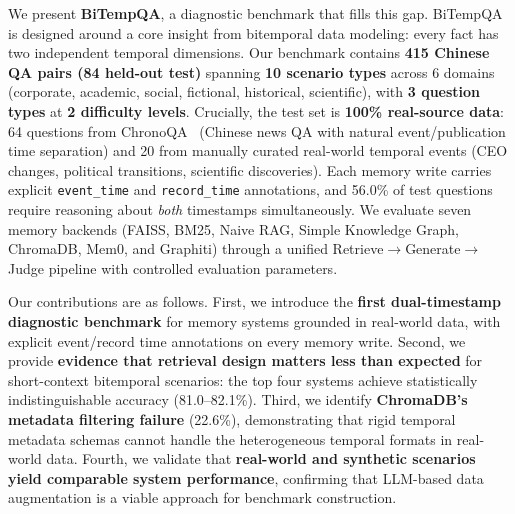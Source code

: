 We present \textbf{BiTempQA}, a diagnostic benchmark that fills this gap.
BiTempQA is designed around a core insight from bitemporal data modeling: every fact has two independent temporal dimensions.
Our benchmark contains \textbf{415 Chinese QA pairs (84 held-out test)} spanning \textbf{10 scenario types} across 6 domains (corporate, academic, social, fictional, historical, scientific), with \textbf{3 question types} at \textbf{2 difficulty levels}.
Crucially, the test set is \textbf{100\% real-source data}: 64 questions from ChronoQA~\citep{chronoqa2025} (Chinese news QA with natural event/publication time separation) and 20 from manually curated real-world temporal events (CEO changes, political transitions, scientific discoveries).
Each memory write carries explicit \texttt{event\_time} and \texttt{record\_time} annotations, and 56.0\% of test questions require reasoning about \emph{both} timestamps simultaneously.
We evaluate seven memory backends (FAISS, BM25, Naive RAG, Simple Knowledge Graph, ChromaDB, Mem0, and Graphiti) through a unified Retrieve$\to$Generate$\to$Judge pipeline with controlled evaluation parameters.

Our contributions are as follows.
First, we introduce the \textbf{first dual-timestamp diagnostic benchmark} for memory systems grounded in real-world data, with explicit event/record time annotations on every memory write.
Second, we provide \textbf{evidence that retrieval design matters less than expected} for short-context bitemporal scenarios: the top four systems achieve statistically indistinguishable accuracy (81.0--82.1\%).
Third, we identify \textbf{ChromaDB's metadata filtering failure} (22.6\%), demonstrating that rigid temporal metadata schemas cannot handle the heterogeneous temporal formats in real-world data.
Fourth, we validate that \textbf{real-world and synthetic scenarios yield comparable system performance}, confirming that LLM-based data augmentation is a viable approach for benchmark construction.
